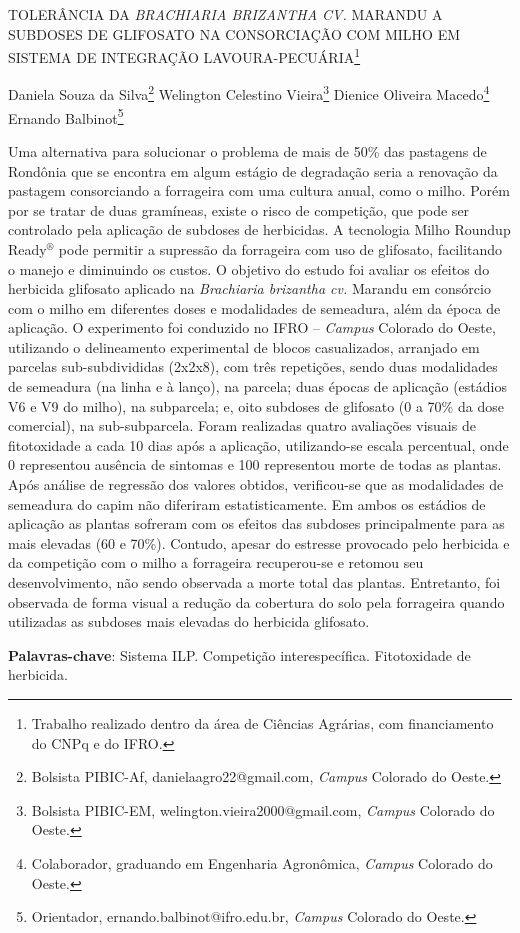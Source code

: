 \documentclass[article,12pt,onesidea,4paper,english,brazil]{abntex2}
\begin{document}
	
	
	\frenchspacing 
	
	\begin{center}
		\LARGE TOLERÂNCIA DA \textit{BRACHIARIA BRIZANTHA CV.} MARANDU A SUBDOSES DE GLIFOSATO NA CONSORCIAÇÃO COM MILHO EM SISTEMA DE INTEGRAÇÃO LAVOURA-PECUÁRIA\footnote{Trabalho realizado dentro da área de Ciências Agrárias, com financiamento do CNPq e do IFRO.}
		
		\normalsize
		Daniela Souza da Silva\footnote{Bolsista PIBIC-Af, danielaagro22@gmail.com, \textit{Campus} Colorado do Oeste.} 
		Welington Celestino Vieira\footnote{Bolsista PIBIC-EM, welington.vieira2000@gmail.com, \textit{Campus} Colorado do Oeste.} 
		Dienice Oliveira Macedo\footnote{Colaborador, graduando em Engenharia Agronômica, \textit{Campus} Colorado do Oeste.} 
		Ernando Balbinot\footnote{Orientador, ernando.balbinot@ifro.edu.br, \textit{Campus} Colorado do Oeste.} 
	\end{center}
	
	\noindent Uma alternativa para solucionar o problema de mais de 50\% das pastagens de
	Rondônia que se encontra em algum estágio de degradação seria a renovação da
	pastagem consorciando a forrageira com uma cultura anual, como o milho. Porém
	por se tratar de duas gramíneas, existe o risco de competição, que pode ser
	controlado pela aplicação de subdoses de herbicidas. A tecnologia Milho Roundup
	Ready$^{®}$ pode permitir a supressão da forrageira com uso de glifosato, facilitando o
	manejo e diminuindo os custos. O objetivo do estudo foi avaliar os efeitos do
	herbicida glifosato aplicado na \textit{Brachiaria brizantha cv.} Marandu em consórcio com
	o milho em diferentes doses e modalidades de semeadura, além da época de
	aplicação. O experimento foi conduzido no IFRO – \textit{Campus} Colorado do Oeste,
	utilizando o delineamento experimental de blocos casualizados, arranjado em
	parcelas sub-subdivididas (2x2x8), com três repetições, sendo duas modalidades
	de semeadura (na linha e à lanço), na parcela; duas épocas de aplicação (estádios
	V6 e V9 do milho), na subparcela; e, oito subdoses de glifosato (0 a 70\% da dose
	comercial), na sub-subparcela. Foram realizadas quatro avaliações visuais de
	fitotoxidade a cada 10 dias após a aplicação, utilizando-se escala percentual, onde
	0 representou ausência de sintomas e 100 representou morte de todas as plantas.
	Após análise de regressão dos valores obtidos, verificou-se que as modalidades de
	semeadura do capim não diferiram estatisticamente. Em ambos os estádios de
	aplicação as plantas sofreram com os efeitos das subdoses principalmente para as
	mais elevadas (60 e 70\%). Contudo, apesar do estresse provocado pelo herbicida e
	da competição com o milho a forrageira recuperou-se e retomou seu
	desenvolvimento, não sendo observada a morte total das plantas. Entretanto, foi
	observada de forma visual a redução da cobertura do solo pela forrageira quando
	utilizadas as subdoses mais elevadas do herbicida glifosato.
	
	\vspace{\onelineskip}
	
	\noindent
	\textbf{Palavras-chave}: Sistema ILP. Competição interespecífica. Fitotoxidade de
	herbicida.	
	
\end{document}
